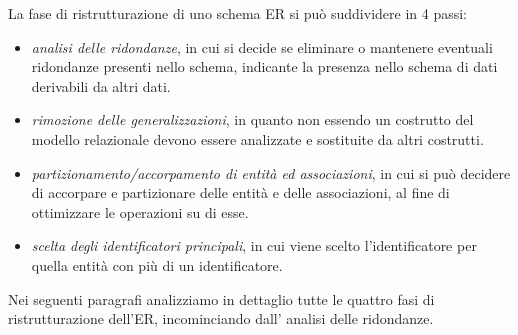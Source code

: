 La fase di ristrutturazione di uno schema ER si può suddividere in 4 passi:
\begin{itemize}
    \item \emph{analisi delle ridondanze}, in cui si decide se eliminare o mantenere eventuali ridondanze presenti nello schema,
          indicante la presenza nello schema di dati derivabili da altri dati.
    \item \emph{rimozione delle generalizzazioni}, in quanto non essendo un costrutto del modello relazionale devono essere
          analizzate e sostituite da altri costrutti.
    \item \emph{partizionamento/accorpamento di entità ed associazioni}, in cui si può decidere di accorpare e partizionare
          delle entità e delle associazioni, al fine di ottimizzare le operazioni su di esse.
    \item \emph{scelta degli identificatori principali}, in cui viene scelto l'identificatore per quella entità con più
          di un identificatore.
\end{itemize}
Nei seguenti paragrafi analizziamo in dettaglio tutte le quattro fasi di ristrutturazione dell'ER, incominciando dall'
analisi delle ridondanze.

